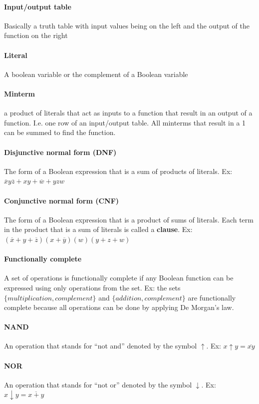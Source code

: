 \documentclass[a4paper]{article}
\begin{document}
\paragraph{Input/output table} Basically a truth table with input values being on the left and the output of the function on the right
\paragraph{Literal} A boolean variable or the complement of a Boolean variable
\paragraph{Minterm} a product of literals that act as inputs to a function that result in an output of a function. I.e. one row of an input/output table. All minterms that result in a 1 can be summed to find the function.
\paragraph{Disjunctive normal form (DNF)} The form of a Boolean expression that is a sum of products of literals. Ex: $\overline{x} y \overline{z} + xy + \overline{w} + yzw$
\paragraph{Conjunctive normal form (CNF)} The form of a Boolean expression that is a product of sums of literals. Each term in the product that is a sum of literals is called a \textbf{clause}. Ex: $(\overline{x} + y + \overline{z}) (x + \overline{y}) (w) (y + z + w)$
\paragraph{Functionally complete} A set of operations is functionally complete if any Boolean function can be expressed using only operations from the set. Ex: the sets $\{multiplication, complement\}$ and $\{addition, complement\}$ are functionally complete because all operations can be done by applying De Morgan's law.
\paragraph{NAND} An operation that stands for ``not and'' denoted by the symbol $\uparrow$. Ex: $x \uparrow y = \overline{xy}$
\paragraph{NOR} An operation that stands for ``not or'' denoted by the symbol $\downarrow$. Ex: $x \downarrow y = \overline{x + y}$
\end{document}
